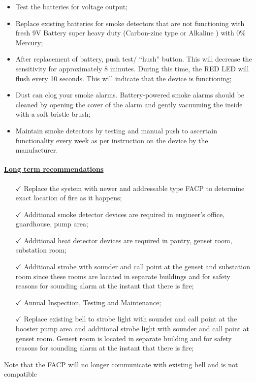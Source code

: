 \begin{itemize}
\item Test the batteries for voltage output;

\item Replace existing batteries for smoke detectors that are not functioning with fresh 9V Battery super heavy duty (Carbon-zinc type or Alkaline ) with 0\% Mercury;

\item After replacement of battery, push test/ “hush” button. This will decrease the sensitivity for approximately 8 minutes. During this time, the RED LED will flush every 10 seconds. This will indicate that the device is functioning;

\item Dust can clog your smoke alarms. Battery-powered smoke alarms should be cleaned by opening the cover of the alarm and gently vacuuming the inside with a soft bristle brush;

\item Maintain smoke detectors by testing and manual push to ascertain functionality every week as per instruction on the device by the manufacturer.

\end{itemize}


\paragraph{\underline{Long term recommendations}}

\begin{itemize}
	\item [$\checkmark$] Replace the system with newer and addressable type FACP to determine exact location of fire as it happens;
	
	\item[$\checkmark$] Additional smoke detector devices are required in engineer’s office, guardhouse, pump area;
	
	\item[$\checkmark$] Additional heat detector devices are required in pantry, genset room, substation room;
	
	\item[$\checkmark$] Additional strobe with sounder and call point  at the genset and substation room since these rooms are located in separate buildings and for safety reasons for sounding alarm at the instant that there is fire;
	
	\item [$\checkmark$]Annual Inspection, Testing and Maintenance;
	
	\item [$\checkmark$] Replace existing bell to strobe light  with sounder and call point  at the booster pump area and additional strobe light with sounder and call point at genset room. Genset room is located in separate building and for safety reasons for sounding alarm at the instant that there is fire;
	
\end{itemize}
Note that the FACP will no longer communicate with existing bell and is not compatible

